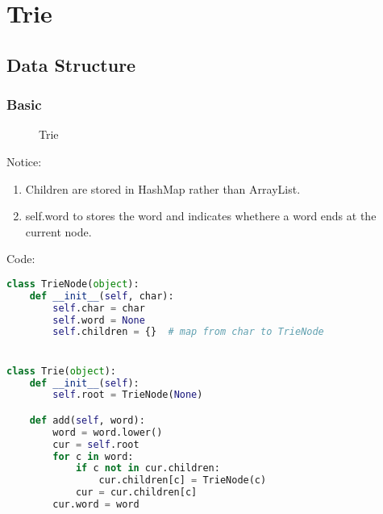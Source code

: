 \chapter{Trie}


\section{Data Structure}
\subsection{Basic}

\begin{figure}[hbtp]
\centering
{}
\caption{Trie}
\label{fig:untypical-point} 
\end{figure}

Notice:
\begin{enumerate}
\item Children are stored in HashMap rather than ArrayList. 
\item self.word to stores the word and indicates whethere a word ends at the current node. 
\end{enumerate}
Code: 
\begin{lstlisting}[language=python]
class TrieNode(object):
    def __init__(self, char):
        self.char = char
        self.word = None
        self.children = {}  # map from char to TrieNode


class Trie(object):
    def __init__(self):
        self.root = TrieNode(None)

    def add(self, word):
        word = word.lower()
        cur = self.root
        for c in word:
            if c not in cur.children:
                cur.children[c] = TrieNode(c)
            cur = cur.children[c]
        cur.word = word
\end{lstlisting}

